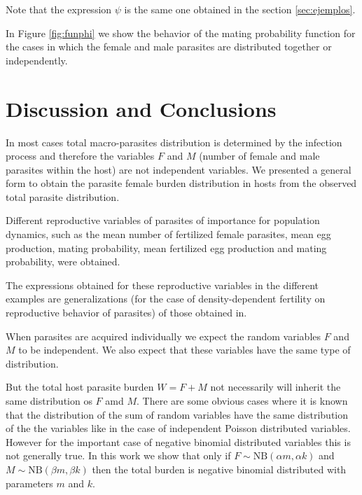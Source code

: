 \documentclass[12pt,a4paper]{article}
\theoremstyle{plain}%
\theoremstyle{definition}
\theoremstyle{remark}
\begin{document}
Note that the expression $\psi$ is the same one obtained in the section \ref{sec:ejemplos}.

	In Figure \ref{fig:funphi} we show the behavior of the mating probability function for the cases in which the female and male parasites are distributed together or independently.

	
	\section{Discussion and Conclusions}
	
		
In most cases total macro-parasites distribution is determined by the infection process and therefore the variables $F$ and $M$ (number of female and male parasites within the host) are not independent variables. We presented a general form to obtain the parasite female burden distribution in hosts from the observed total parasite distribution. 	
	
Different reproductive variables of parasites of importance for population dynamics, such as the mean number of fertilized female parasites, mean egg production, mating probability, mean fertilized egg production and mating probability, were obtained. 
	
The  expressions obtained for these reproductive variables in the different examples are generalizations (for the case of density-dependent fertility on reproductive behavior of parasites) of those obtained in\citep{leyton1968stochastic,may1993biased,may1977togetherness}.



When parasites are acquired individually we expect the random variables $F$ and $M$ to be independent. We also expect that these variables have the same type of distribution. 


But the total host parasite burden $W=F+M$ not necessarily will inherit the same distribution os $F$ amd $M$. There are some obvious cases where it is known that the distribution of the sum of random variables have the same distribution of the the variables like in the case of independent Poisson distributed variables. However for the important case of negative binomial distributed variables this is not generally true. In this work we show that 
only if
$F\sim \mathrm{NB}(\alpha m,\alpha k)$ and $ M\sim \mathrm{NB}(\beta m,\beta k)$ then the total burden is negative binomial distributed with parameters $m$ and $k$. 
\end{document}
